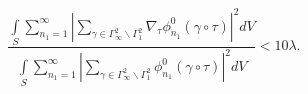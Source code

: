 \begin{equation}
\frac{\int\limits_{S}
\sum\limits_{n_{1}=1}^{\infty}\left|
\sum\limits_{\gamma\in\Gamma^{2}_{\infty}\backslash\Gamma^{2}_{1}}
\nabla_{\tau}\phi^0_{n_{1}}
(\gamma\circ\tau)\right|^2 dV}
{\int\limits_{S}
\sum\limits_{n_{1}=1}^{\infty}
\left|
\sum\limits_{\gamma\in\Gamma^{2}_{\infty}\backslash\Gamma^{2}_{1}}
\phi^0_{n_{1}}(\gamma\circ\tau)\right|^2 dV} < 10 \lambda.
\end{equation}

